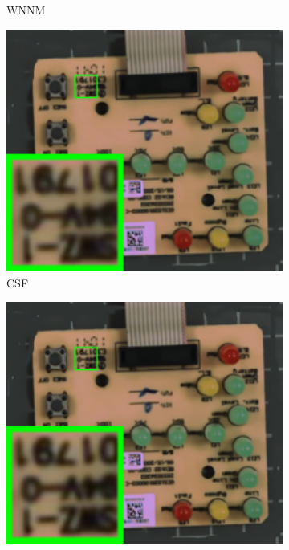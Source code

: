 \begin{figure}
\begin{subfigure}[t]{0.19\textwidth}
\caption{WNNM}
    \end{subfigure}
    \hfill
    \begin{subfigure}[t]{0.19\textwidth}
        \centering
        \includegraphics[width=1\textwidth]{images/guided/nc/resize_br_CSF_circuit.png}
\caption{CSF}
    \end{subfigure}
\hfill
    \begin{subfigure}[t]{0.19\textwidth}
        \centering
        \includegraphics[width=1\textwidth]{images/guided/nc/resize_br_TRD_circuit.png}

\end{subfigure}
\end{figure}
